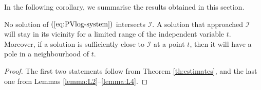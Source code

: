 In the following corollary, we summarise the results obtained in this section.

\begin{corollary}\label{cor:infinity}
No solution of $(\ref{eq:PVlog-system})$ intersects $\mathcal{I}$.
A solution that approached $\mathcal{I}$ will stay in its vicinity for a limited range of the independent variable $t$.
Moreover, if a solution is sufficiently close to $\mathcal{I}$ at a point $t$, then it will have a pole in a neighbourhood of $t$. 
\end{corollary}

\begin{proof}
The first two statements follow from Theorem \ref{th:estimates}, and the last one from Lemmas \ref{lemma:L2}--\ref{lemma:L4}.
\end{proof}

